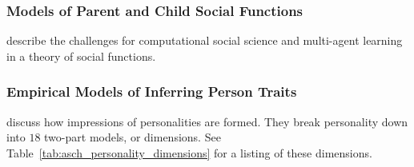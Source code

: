 \subsubsection{Models of Parent and Child Social Functions}
\cite{castelfranchi:2001} describe the challenges for computational social science and multi-agent learning in a theory of social functions.


\subsubsection{Empirical Models of Inferring Person Traits}

\cite{asch:2005} discuss how impressions of personalities are formed.
They break personality down into $18$ two-part models, or dimensions.
See Table~\ref{tab:asch_personality_dimensions} for a listing of these dimensions.

